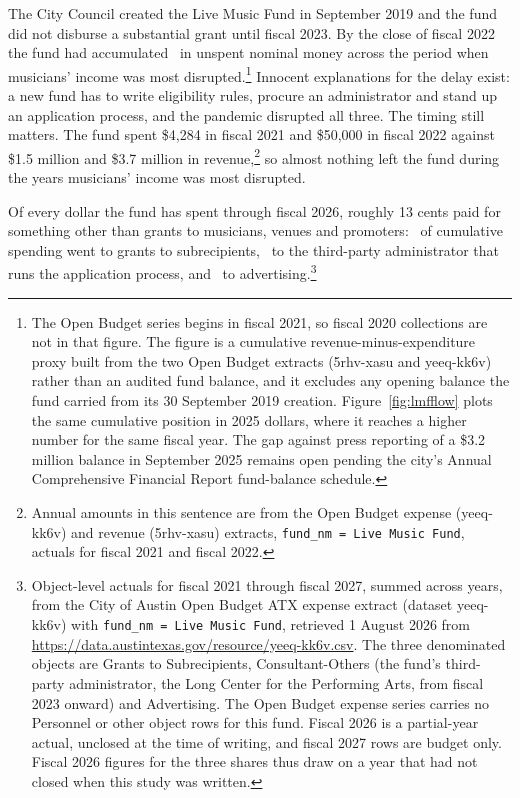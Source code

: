 The City Council created the Live Music Fund in September 2019 and the
fund did not disburse a substantial grant until fiscal 2023. By the close
of fiscal 2022 the fund had accumulated \NCityLmfAccumByFyTwoTwoNominal\
in unspent nominal money across the period when musicians' income was
most disrupted.\footnote{The Open Budget series begins in fiscal 2021, so
fiscal 2020 collections are not in that figure. The figure is a cumulative
revenue-minus-expenditure proxy built from the two Open Budget extracts
(5rhv-xasu and yeeq-kk6v) rather than an audited fund balance, and it
excludes any opening balance the fund carried from its 30 September 2019
creation. Figure~\ref{fig:lmfflow} plots the same cumulative position in
2025 dollars, where it reaches a higher number for the same fiscal year.
The gap against press reporting of a \$3.2 million balance in September
2025 remains open pending the city's Annual Comprehensive Financial
Report fund-balance schedule.} Innocent explanations for the delay exist:
a new fund has to write eligibility rules, procure an administrator and
stand up an application process, and the pandemic disrupted all three.
The timing still matters. The fund spent \$4,284 in fiscal 2021 and
\$50,000 in fiscal 2022 against \$1.5 million and \$3.7 million in
revenue,\footnote{Annual amounts in this sentence are from the Open Budget
expense (yeeq-kk6v) and revenue (5rhv-xasu) extracts,
\texttt{fund\_nm~=~Live~Music~Fund}, actuals for fiscal 2021 and fiscal
2022.} so almost nothing left the fund during the years musicians' income
was most disrupted.

Of every dollar the fund has spent through fiscal 2026, roughly 13 cents
paid for something other than grants to musicians, venues and promoters:
\NCityLmfAdminShareGrants\ of cumulative spending went to grants to
subrecipients, \NCityLmfAdminShareConsultant\ to the third-party
administrator that runs the application process, and
\NCityLmfAdminShareAdvertising\ to advertising.\footnote{Object-level
actuals for fiscal 2021 through fiscal 2027, summed across years, from the
City of Austin Open Budget ATX expense extract (dataset yeeq-kk6v) with
\texttt{fund\_nm~=~Live~Music~Fund}, retrieved 1 August 2026 from
\url{https://data.austintexas.gov/resource/yeeq-kk6v.csv}. The three
denominated objects are Grants to Subrecipients, Consultant-Others (the
fund's third-party administrator, the Long Center for the Performing
Arts, from fiscal 2023 onward) and Advertising. The Open Budget expense
series carries no Personnel or other object rows for this fund. Fiscal
2026 is a partial-year actual, unclosed at the time of writing, and
fiscal 2027 rows are budget only. Fiscal 2026 figures for the three
shares thus draw on a year that had not closed when this study was
written.}

